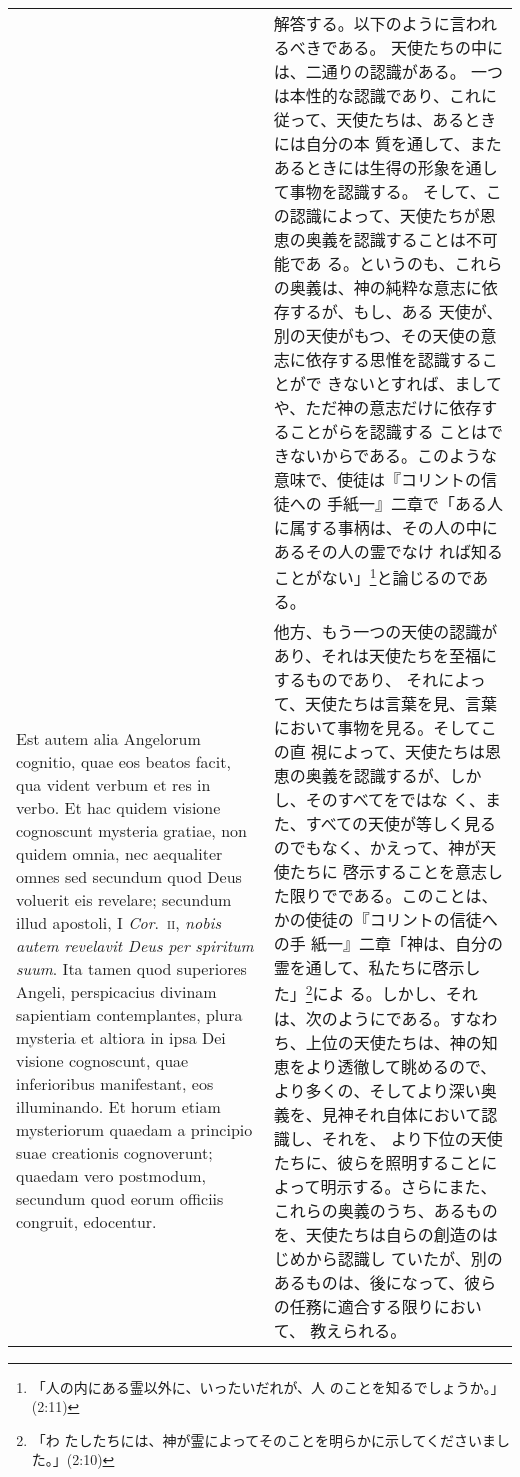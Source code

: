 \documentclass[10pt]{jsarticle} %
\begin{document}
\begin{longtable}{p{21em}p{21em}}
&

解答する。以下のように言われるべきである。
天使たちの中には、二通りの認識がある。
一つは本性的な認識であり、これに従って、天使たちは、あるときには自分の本
 質を通して、またあるときには生得の形象を通して事物を認識する。
そして、この認識によって、天使たちが恩恵の奥義を認識することは不可能であ
 る。というのも、これらの奥義は、神の純粋な意志に依存するが、もし、ある
 天使が、別の天使がもつ、その天使の意志に依存する思惟を認識することがで
 きないとすれば、ましてや、ただ神の意志だけに依存することがらを認識する
 ことはできないからである。このような意味で、使徒は『コリントの信徒への
 手紙一』二章で「ある人に属する事柄は、その人の中にあるその人の霊でなけ
 れば知ることがない」\footnote{「人の内にある霊以外に、いったいだれが、人
 のことを知るでしょうか。」(2:11)}と論じるのである。

\\




Est autem alia Angelorum cognitio, quae eos beatos facit,
qua vident verbum et res in verbo. Et hac quidem visione cognoscunt
mysteria gratiae, non quidem omnia, nec aequaliter omnes sed secundum
quod Deus voluerit eis revelare; secundum illud apostoli, I {\itshape Cor}.~{\scshape ii},
{\itshape nobis autem revelavit Deus per spiritum suum}. Ita tamen quod superiores
Angeli, perspicacius divinam sapientiam contemplantes, plura mysteria et
altiora in ipsa Dei visione cognoscunt, quae inferioribus manifestant,
eos illuminando. Et horum etiam mysteriorum quaedam a principio suae
creationis cognoverunt; quaedam vero postmodum, secundum quod eorum
officiis congruit, edocentur.


&

他方、もう一つの天使の認識があり、それは天使たちを至福にするものであり、
 それによって、天使たちは言葉を見、言葉において事物を見る。そしてこの直
 視によって、天使たちは恩恵の奥義を認識するが、しかし、そのすべてをではな
 く、また、すべての天使が等しく見るのでもなく、かえって、神が天使たちに
 啓示することを意志した限りでである。このことは、かの使徒の『コリントの信徒への手
 紙一』二章「神は、自分の霊を通して、私たちに啓示した」\footnote{「わ
 たしたちには、神が霊によってそのことを明らかに示してくださいました。」(2:10)}によ
 る。しかし、それは、次のようにである。すなわち、上位の天使たちは、神の知恵をより透徹して眺めるので、
 より多くの、そしてより深い奥義を、見神それ自体において認識し、それを、
 より下位の天使たちに、彼らを照明することによって明示する。さらにまた、
 これらの奥義のうち、あるものを、天使たちは自らの創造のはじめから認識し
 ていたが、別のあるものは、後になって、彼らの任務に適合する限りにおいて、
 教えられる。



\end{longtable}
\end{document}
